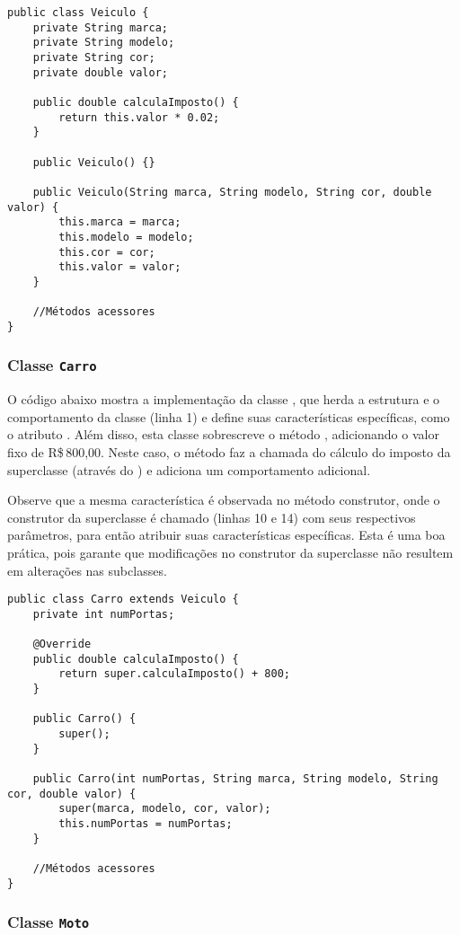 \begin{verbatim}
public class Veiculo {
	private String marca;
	private String modelo;
	private String cor;
	private double valor;
	
	public double calculaImposto() {
		return this.valor * 0.02;
	}
	
	public Veiculo() {}
	
	public Veiculo(String marca, String modelo, String cor, double valor) {
		this.marca = marca;
		this.modelo = modelo;
		this.cor = cor;
		this.valor = valor;
	}
	
	//Métodos acessores
}
\end{verbatim}

\subsubsection{Classe \texttt{Carro}}

O código abaixo mostra a implementação da classe , que herda a estrutura e o comportamento da classe  (linha 1) e define suas características específicas, como o atributo . Além disso, esta classe sobrescreve o método , adicionando o valor fixo de R\$\,800,00. Neste caso, o método faz a chamada do cálculo do imposto da superclasse (através do ) e adiciona um comportamento adicional.

Observe que a mesma característica é observada no método construtor, onde o construtor da superclasse é chamado (linhas 10 e 14) com seus respectivos parâmetros, para então atribuir suas características específicas. Esta é uma boa prática, pois garante que modificações no construtor da superclasse não resultem em alterações nas subclasses.

\begin{verbatim}
public class Carro extends Veiculo {
	private int numPortas;

	@Override
	public double calculaImposto() {
		return super.calculaImposto() + 800;
	}

	public Carro() {
		super();
	}

	public Carro(int numPortas, String marca, String modelo, String cor, double valor) {
		super(marca, modelo, cor, valor);
		this.numPortas = numPortas;
	}

	//Métodos acessores
}
\end{verbatim}

\subsubsection{Classe \texttt{Moto}}

